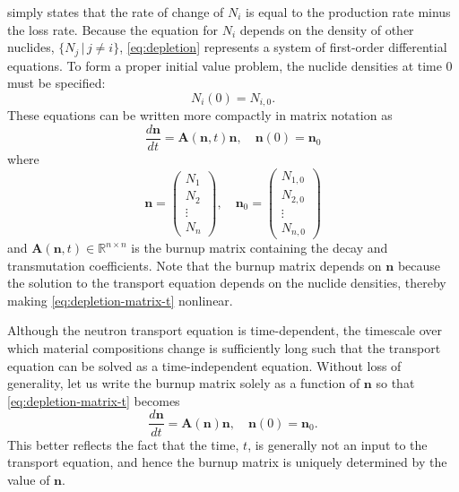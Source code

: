 \documentclass[3p,authoryear]{elsarticle}
\begin{document}
 simply states that the rate of change of $N_i$ is equal to
the production rate minus the loss rate. Because the equation for $N_i$ depends
on the density of other nuclides, $\{N_j \,|\, j \ne i\}$, \cref{eq:depletion}
represents a system of first-order differential equations. To form a proper
initial value problem, the nuclide densities at time 0 must be specified:
\begin{equation}
    N_i(0) = N_{i,0}.
\end{equation}
These equations can be written more compactly in matrix notation as
\begin{equation}
  \label{eq:depletion-matrix-t}
  \frac{d\mathbf{n}}{dt} = \mathbf{A}(\mathbf{n},t)\mathbf{n}, \quad \mathbf{n}(0) =
  \mathbf{n}_0
\end{equation}
where
\begin{equation}
  \mathbf{n} = \begin{pmatrix} N_1 \\ N_2 \\ \vdots \\ N_n \end{pmatrix}, \quad
  \mathbf{n}_0 = \begin{pmatrix} N_{1,0} \\ N_{2,0} \\ \vdots \\ N_{n,0} \end{pmatrix}
\end{equation}
and $\mathbf{A}(\mathbf{n},t) \in \mathbb{R}^{n\times n}$ is the burnup matrix
containing the decay and transmutation coefficients. Note that the burnup matrix
depends on $\mathbf{n}$ because the solution to the transport equation depends
on the nuclide densities, thereby making \cref{eq:depletion-matrix-t} nonlinear.

Although the neutron transport equation is time-dependent, the timescale over
which material compositions change is sufficiently long such that the transport
equation can be solved as a time-independent equation. Without loss of
generality, let us write the burnup matrix solely as a function of $\mathbf{n}$
so that \cref{eq:depletion-matrix-t} becomes
\begin{equation}
  \label{eq:depletion-matrix}
  \frac{d\mathbf{n}}{dt} = \mathbf{A}(\mathbf{n})\mathbf{n}, \quad \mathbf{n}(0) =
  \mathbf{n}_0.
\end{equation}
This better reflects the fact that the time, $t$, is generally not an input to
the transport equation, and hence the burnup matrix is uniquely determined by
the value of $\mathbf{n}$.
\end{document}
